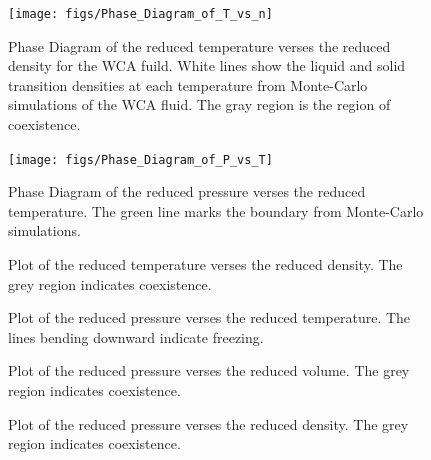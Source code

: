 \documentclass[double,12pt]{beavtex}
\begin{document}
\begin{figure}
  \centering
  \texttt{[image: figs/Phase\_Diagram\_of\_T\_vs\_n]}
  \caption{Phase Diagram of the reduced temperature verses the reduced density for the WCA fuild. 
  White lines show the liquid and solid transition densities at each temperature from 
  Monte-Carlo simulations of the WCA fluid. The gray region is the region of coexistence.}
  \label{fig:Phase_Diagram_of_T_vs_n}
\end{figure}

\begin{figure}
  \centering
  \texttt{[image: figs/Phase\_Diagram\_of\_P\_vs\_T]}
  \caption{Phase Diagram of the reduced pressure verses the reduced temperature. 
  The green line marks the boundary from Monte-Carlo simulations.}
  \label{fig:Phase_Diagram_P_vs_T}
\end{figure}


\begin{figure}
  \centering
  \caption{Plot of the reduced temperature verses the reduced density. 
  The grey region indicates coexistence.}
  \label{fig:T-vs-n_at_fixed_P}
\end{figure}

\begin{figure}
  \centering
  \caption{Plot of the reduced pressure verses the reduced temperature. 
  The lines bending downward indicate freezing.}
  \label{fig:p-vs-T_at_fixed_density}
\end{figure}

\begin{figure}
  \centering
  \caption{Plot of the reduced pressure verses the reduced volume. 
  The grey region indicates coexistence.}
  \label{fig:p-vs-V_at_fixed_T}
\end{figure}

\begin{figure}
  \centering
  \caption{Plot of the reduced pressure verses the reduced density. 
  The grey region indicates coexistence.}
  \label{fig:p-vs-n_at_fixed_T}
\end{figure}


\[{}\]
\[{}\]
\[{}\]
\[{}\]

\[{}\]
\[{}\]
\[{}\]
\[{}\]
\end{document}
